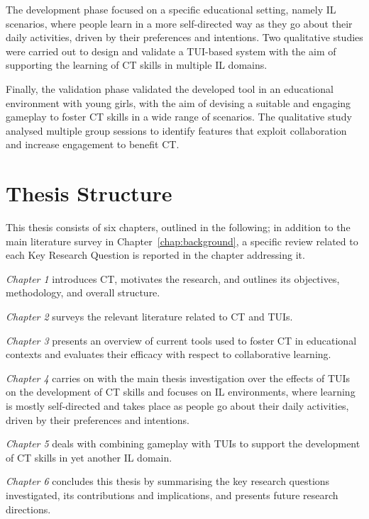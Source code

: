 The development phase focused on a specific educational setting, namely \ac{IL} scenarios, where people learn in a more self-directed way as they go about their daily activities, driven by their preferences and intentions. Two qualitative studies were carried out to design and validate a \ac{TUI}-based system with the aim of supporting the learning of \ac{CT} skills in multiple \ac{IL} domains.

Finally, the validation phase validated the developed tool in an educational environment with young girls, with the aim of devising a suitable and engaging gameplay to foster \ac{CT} skills in a wide range of scenarios. The qualitative study analysed multiple group sessions to identify features that exploit collaboration and increase engagement to benefit \ac{CT}.

\section{Thesis Structure}
This thesis consists of six chapters, outlined in the following; in addition to the main literature survey in Chapter~\ref{chap:background}, a specific review related to each Key Research Question is reported in the chapter addressing it.

\textit{Chapter 1} introduces \ac{CT}, motivates the research, and outlines its objectives, methodology, and overall structure.

\textit{Chapter 2} surveys the relevant literature related to \acl{CT} and \aclp{TUI}.

\textit{Chapter 3} presents an overview of current tools used to foster \ac{CT} in educational contexts and evaluates their efficacy with respect to collaborative learning.

\textit{Chapter 4} carries on with the main thesis investigation over the effects of \aclp{TUI} on the development of \ac{CT} skills and focuses on \acl{IL} environments, where learning is mostly self-directed and takes place as people go about their daily activities, driven by their preferences and intentions.

\textit{Chapter 5} deals with combining gameplay with \acp{TUI} to support the development of \ac{CT} skills in yet another \ac{IL} domain.

\textit{Chapter 6} concludes this thesis by summarising the key research questions investigated, its contributions and implications, and presents future research directions.